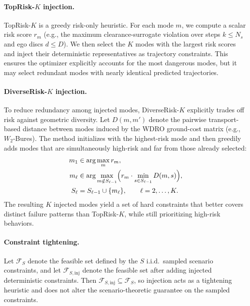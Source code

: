 \documentclass[letterpaper,10pt,conference]{ieeeconf}
\begin{document}
\paragraph{TopRisk-$K$ injection.}
TopRisk-$K$ is a greedy risk-only heuristic. For each mode $m$, we compute a scalar risk score $r_m$ (e.g., the maximum clearance-surrogate violation over steps $k\le N_s$ and ego discs $d\le D$). We then select the $K$ modes with the largest risk scores and inject their deterministic representatives as trajectory constraints. This ensures the optimizer explicitly accounts for the most dangerous modes, but it may select redundant modes with nearly identical predicted trajectories.

\paragraph{DiverseRisk-$K$ injection.}
To reduce redundancy among injected modes, DiverseRisk-$K$ explicitly trades off risk against geometric diversity. Let $D(m,m')$ denote the pairwise transport-based distance between modes induced by the WDRO ground-cost matrix (e.g., $W_2$-Bures). The method initializes with the highest-risk mode and then greedily adds modes that are simultaneously high-risk and far from those already selected:
\begin{align}
m_1 &\in \arg\max_m r_m, \notag\\
m_{\ell} &\in \arg\max_{m\notin S_{\ell-1}}
\Bigl(r_m \cdot \min_{s\in S_{\ell-1}} D(m,s)\Bigr), \notag\\
S_{\ell} &= S_{\ell-1}\cup\{m_{\ell}\},
\qquad \ell=2,\dots,K. \notag
\end{align}
The resulting $K$ injected modes yield a set of hard constraints that better covers distinct failure patterns than TopRisk-$K$, while still prioritizing high-risk behaviors.

\paragraph{Constraint tightening.}
Let $\mathcal F_S$ denote the feasible set defined by the $S$ i.i.d.\ sampled scenario constraints, and let $\mathcal F_{S,\mathrm{inj}}$ denote the feasible set after adding injected deterministic constraints. Then $\mathcal F_{S,\mathrm{inj}}\subseteq \mathcal F_S$, so injection acts as a tightening heuristic and does not alter the scenario-theoretic guarantee on the sampled constraints.

\end{document}
